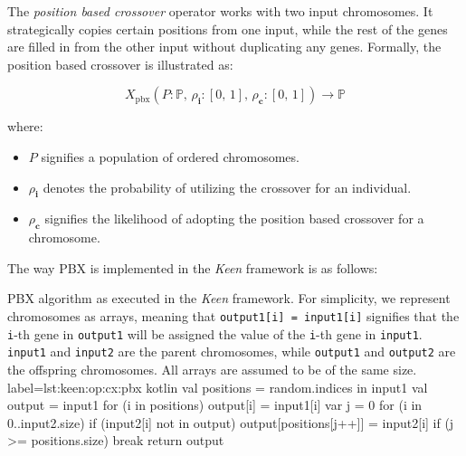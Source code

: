 
\begin{definition}
    The \textit{position based crossover} operator works with two input chromosomes. It strategically copies certain 
    positions from one input, while the rest of the genes are filled in from the other input without duplicating any 
    genes. Formally, the position based crossover is illustrated as:

    \begin{equation}
        X_\mathrm{pbx}(P: \mathbb{P},\, \rho_\textbf{i}: [0,\, 1],\, \rho_\mathbf{c}: [0,\, 1]) \to \mathbb{P}
    \end{equation}

    where:

    \begin{itemize}
      \item \(P\) signifies a population of ordered chromosomes.
      \item \(\rho_\textbf{i}\) denotes the probability of utilizing the crossover for an individual.
      \item \(\rho_\mathbf{c}\) signifies the likelihood of adopting the position based crossover for a chromosome.
    \end{itemize}
\end{definition}

The way PBX is implemented in the \textit{Keen} framework is as follows:

\begin{code}{
    PBX algorithm as executed in the \textit{Keen} framework. For simplicity, we represent chromosomes as arrays,
    meaning that \texttt{output1[i] = input1[i]} signifies that the \texttt{i}-th gene in \texttt{output1} will be
    assigned the value of the \texttt{i}-th gene in \texttt{input1}. \texttt{input1} and \texttt{input2} are the parent
    chromosomes, while \texttt{output1} and \texttt{output2} are the offspring chromosomes. All arrays are assumed to
    be of the same size.
}{
    label={lst:keen:op:cx:pbx}
}{kotlin}
    val positions = random.indices in input1
    val output = input1
    for (i in positions) {
        output[i] = input1[i]
    }
    var j = 0
    for (i in 0..input2.size) {
        if (input2[i] not in output) {
            output[positions[j++]] = input2[i]
            if (j >= positions.size) {
                break
            }
        }
    }
    return output
\end{code}

